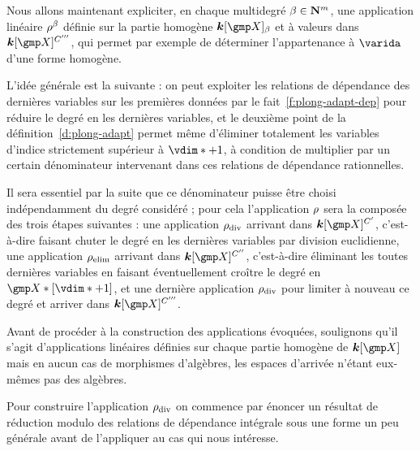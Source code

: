 Nous allons maintenant expliciter, en chaque multidegré \( \beta \in {\mathbf{N}}^m
\), une application linéaire \( \rho^\beta \) définie sur la partie homogène
\( \cdn[ \vmp ]_\beta \) et à valeurs dans \( \cdn[ \vmp ]^{C'''} \), qui
permet par exemple de déterminer l'appartenance à \( \varida \) d'une forme
homogène.

L'idée générale est la suivante : on peut exploiter les relations de
dépendance des dernières variables sur les premières données par le
fait~\vref{f:plong-adapt-dep} pour réduire le degré en les dernières variables,
et le deuxième point de la définition~\vref{d:plong-adapt} permet même
d'éliminer totalement les variables d'indice strictement supérieur à \( \vdim*
  + 1 \), à condition de multiplier par un certain dénominateur intervenant
dans ces relations de dépendance rationnelles.

Il sera essentiel par la suite que ce dénominateur puisse être choisi
indépendamment du degré considéré ; pour cela l'application \( \rho \)
sera la composée des trois étapes suivantes : une application \( \rho\sb{\mathrm{div }} \)
arrivant dans \( \cdn[ \vmp ]^{C'} \), c'est-à-dire faisant chuter le degré en
les dernières variables par division euclidienne, une application \( \rho\sb{\mathrm{elim}} \)
arrivant dans \( \cdn[ \vmp ]^{C''} \), c'est-à-dire éliminant
les toutes dernières variables en faisant éventuellement croître le degré en
\( \vmp*[\vdim*+1] \), et une dernière application \( \rho\sb{\mathrm{div }} \) pour limiter à
nouveau ce degré et arriver dans \( \cdn[ \vmp ]^{C'''} \).

Avant de procéder à la construction des applications évoquées, soulignons
qu'il s'agit d'applications linéaires définies sur chaque partie homogène de
\( \cdn[ \vmp ] \) mais en aucun cas de morphismes d'algèbres, les espaces
d'arrivée n'étant eux-mêmes pas des algèbres.

Pour construire l'application \( \rho\sb{\mathrm{div }} \) on commence par énoncer un résultat
de réduction modulo des relations de dépendance intégrale sous une forme un
peu générale avant de l'appliquer au cas qui nous intéresse.

